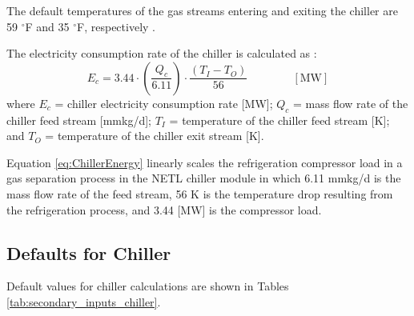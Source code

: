 \documentclass[11pt]{report}
\newcommand{\eqnunit}[1]{\quad\quad \scriptstyle{\left[\text{#1}\right]}}
\begin{document}
The default temperatures of the gas streams entering and exiting the chiller are 59 $^{\circ}${F} and 35 $^{\circ}${F}, respectively \cite{NETLChillerModel}.



The electricity consumption rate of the chiller is calculated as \cite{NETLChillerModel}:
\begin{equation} \label{eq:ChillerEnergy}
E_{c}=3.44\cdot\left(\frac{Q_{c}}{6.11}\right)\cdot\frac{\left(T_{I}-T_{O}\right)}{56} \quad \quad \eqnunit{MW}
\end{equation}
where $E_{c}$ = chiller electricity consumption rate [MW]; $Q_{c}$ = mass flow rate of the chiller feed stream [mmkg/d]; $T_{I}$ = temperature of the chiller feed stream [{K}]; and $T_{O}$ = temperature of the chiller exit stream [{K}]. 

Equation \ref{eq:ChillerEnergy} linearly scales the refrigeration compressor load in a gas separation process in the NETL chiller module \cite{NETLChillerModel} in which 6.11 mmkg/d is the mass flow rate of the feed stream, 56 {K} is the temperature drop resulting from the refrigeration process, and 3.44 [MW] is the compressor load.


\subsection{Defaults for Chiller}

Default values for chiller calculations are shown in Tables \ref{tab:secondary_inputs_chiller}.

\end{document}

